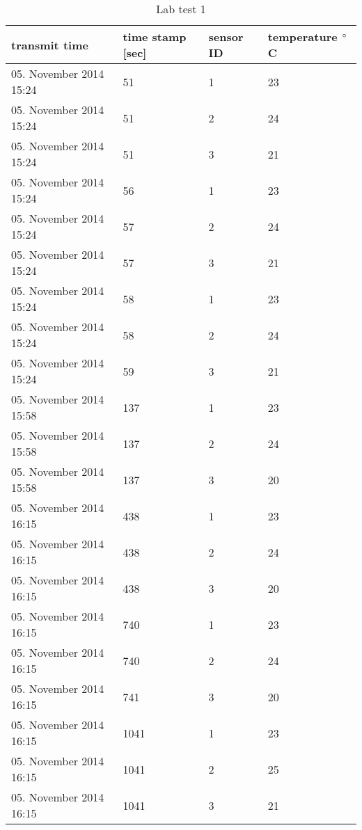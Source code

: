 \begin{table}[H]
	\begin{tabular}
		{| p{6cm} |  p{4cm} | p{2cm} | p{3cm}  |}
		\hline
		transmit time & time stamp [sec] & sensor ID & temperature $\degree$C  \\ \hline
		05. November 2014 15:24 & 51   & 1 & 23 \\  \hline
		05. November 2014 15:24 & 51   & 2 & 24 \\  \hline
		05. November 2014 15:24 & 51   & 3 & 21 \\  \hline
		05. November 2014 15:24 & 56   & 1 & 23 \\  \hline
	    05. November 2014 15:24 & 57   & 2 & 24 \\  \hline
		05. November 2014 15:24 & 57   & 3 & 21 \\  \hline
		05. November 2014 15:24 & 58   & 1 & 23 \\  \hline
		05. November 2014 15:24 & 58   & 2 & 24 \\  \hline
		05. November 2014 15:24 & 59   & 3 & 21 \\  \hline
		05. November 2014 15:58 & 137  & 1 & 23 \\  \hline
		05. November 2014 15:58 & 137  & 2 & 24 \\  \hline
		05. November 2014 15:58 & 137  & 3 & 20 \\  \hline
		05. November 2014 16:15 & 438  & 1 & 23 \\  \hline
		05. November 2014 16:15 & 438  & 2 & 24 \\  \hline
		05. November 2014 16:15 & 438  & 3 & 20 \\  \hline
		05. November 2014 16:15 & 740  & 1 & 23 \\  \hline
		05. November 2014 16:15 & 740  & 2 & 24 \\  \hline
		05. November 2014 16:15 & 741  & 3 & 20 \\  \hline
		05. November 2014 16:15 & 1041 & 1 & 23 \\  \hline
		05. November 2014 16:15 & 1041 & 2 & 25 \\  \hline
		05. November 2014 16:15 & 1041 & 3 & 21 \\  \hline
	
		
		
	\end{tabular}
		\label{table:Table_3}
		\caption{Lab test 1}
\end{table}

